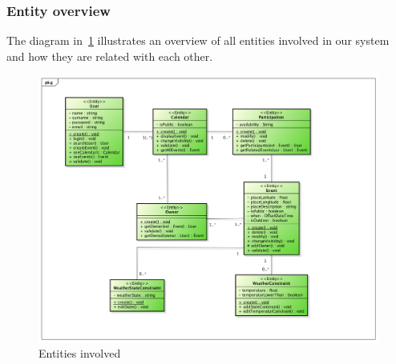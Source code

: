 \begin{itemize}
\subsubsection{Entity overview}
The diagram in~\ref{fig:entityovervie} illustrates an overview of all entities involved in our system and how they are related with each other.
 \begin{center}
 \begin{figure}[H]
    \includegraphics[width=1\textwidth]{../BCEDiagram/BCE/EntityOverview/Entity.png}
    \caption{Entities involved}
     \label{fig:entityovervie}
     \end{figure}
   \end{center}  



\end{itemize}
